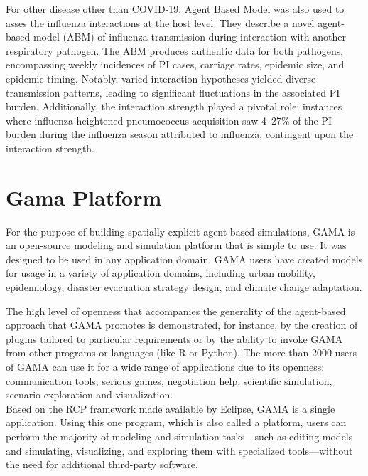 For other disease other than COVID-19, Agent Based Model was also used to asses the influenza interactions at the host level. They describe a novel agent-based model (ABM) of influenza transmission during interaction with another respiratory pathogen. The ABM produces authentic data for both pathogens, encompassing weekly incidences of PI cases, carriage rates, epidemic size, and epidemic timing. Notably, varied interaction hypotheses yielded diverse transmission patterns, leading to significant fluctuations in the associated PI burden. Additionally, the interaction strength played a pivotal role: instances where influenza heightened pneumococcus acquisition saw 4–27\% of the PI burden during the influenza season attributed to influenza, contingent upon the interaction strength. \cite{arduin-2017}

\section{Gama Platform}
For the purpose of building spatially explicit agent-based simulations, GAMA is an open-source modeling and simulation platform that is simple to use. It was designed to be used in any application domain. GAMA users have created models for usage in a variety of application domains, including urban mobility, epidemiology, disaster evacuation strategy design, and climate change adaptation.\\ \cite{unknown-author-no-date}

The high level of openness that accompanies the generality of the agent-based approach that GAMA promotes is demonstrated, for instance, by the creation of plugins tailored to particular requirements or by the ability to invoke GAMA from other programs or languages (like R or Python). The more than 2000 users of GAMA can use it for a wide range of applications due to its openness: communication tools, serious games, negotiation help, scientific simulation, scenario exploration and visualization.\\

Based on the RCP framework made available by Eclipse, GAMA is a single application. Using this one program, which is also called a platform, users can perform the majority of modeling and simulation tasks—such as editing models and simulating, visualizing, and exploring them with specialized tools—without the need for additional third-party software.